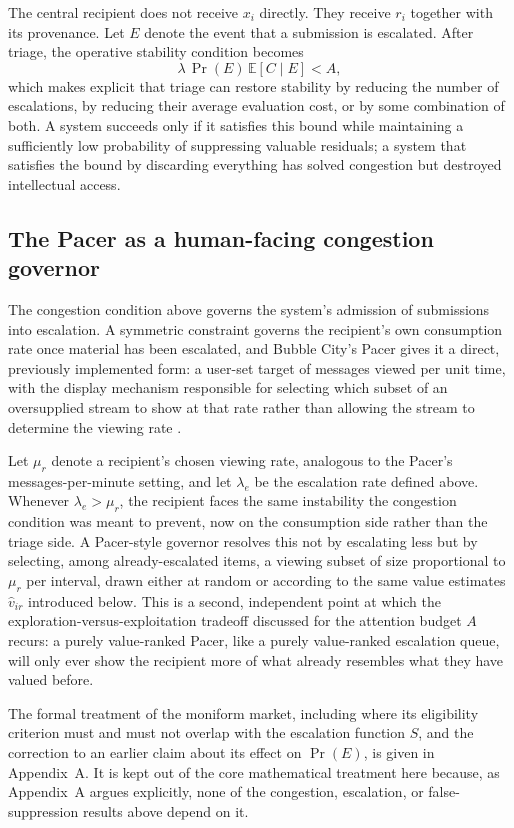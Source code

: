 \documentclass[11pt]{article}
\begin{document}
The central recipient does not receive $x_i$ directly. They receive $r_i$ together with its provenance. Let $E$ denote the event that a submission is escalated. After triage, the operative stability condition becomes
\[
\lambda\,\Pr(E)\,\mathbb{E}[C \mid E] < A,
\]
which makes explicit that triage can restore stability by reducing the number of escalations, by reducing their average evaluation cost, or by some combination of both. A system succeeds only if it satisfies this bound while maintaining a sufficiently low probability of suppressing valuable residuals; a system that satisfies the bound by discarding everything has solved congestion but destroyed intellectual access.

\subsection{The Pacer as a human-facing congestion governor}

The congestion condition above governs the system's admission of submissions into escalation. A symmetric constraint governs the recipient's own consumption rate once material has been escalated, and Bubble City's Pacer gives it a direct, previously implemented form: a user-set target of messages viewed per unit time, with the display mechanism responsible for selecting which subset of an oversupplied stream to show at that rate rather than allowing the stream to determine the viewing rate \cite{anderson2022bubblecity}.

Let $\mu_r$ denote a recipient's chosen viewing rate, analogous to the Pacer's messages-per-minute setting, and let $\lambda_e$ be the escalation rate defined above. Whenever $\lambda_e > \mu_r$, the recipient faces the same instability the congestion condition was meant to prevent, now on the consumption side rather than the triage side. A Pacer-style governor resolves this not by escalating less but by selecting, among already-escalated items, a viewing subset of size proportional to $\mu_r$ per interval, drawn either at random or according to the same value estimates $\widehat{v}_{ir}$ introduced below. This is a second, independent point at which the exploration-versus-exploitation tradeoff discussed for the attention budget $A$ recurs: a purely value-ranked Pacer, like a purely value-ranked escalation queue, will only ever show the recipient more of what already resembles what they have valued before.

The formal treatment of the moniform market, including where its eligibility criterion must and must not overlap with the escalation function $S$, and the correction to an earlier claim about its effect on $\Pr(E)$, is given in Appendix~A. It is kept out of the core mathematical treatment here because, as Appendix~A argues explicitly, none of the congestion, escalation, or false-suppression results above depend on it.
\end{document}
